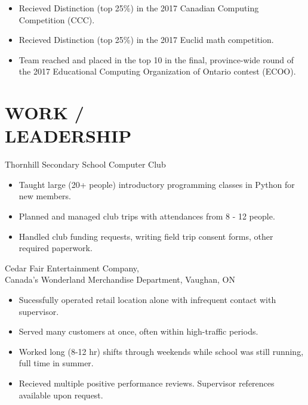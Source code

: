 \documentclass[11pt, margin, line]{res}
\begin{document}
\begin{resume}
        \vspace{-\topsep}
        \begin{itemize}
            \item Recieved Distinction (top 25\%) in the 2017 Canadian Computing Competition (CCC).
            \item Recieved Distinction (top 25\%) in the 2017 Euclid math competition.
            \item Team reached and placed in the top 10 in the final, province-wide round of the 2017 Educational Computing Organization of Ontario contest (ECOO).
        \end{itemize}



\section{WORK /\\ LEADERSHIP} 
        Thornhill Secondary School Computer Club
        \begin{itemize}
            \item Taught large (20+ people) introductory programming classes in Python for new members.
            \item Planned and managed club trips with attendances from 8 - 12 people.
            \item Handled club funding requests, writing field trip consent forms, other required paperwork.
        \end{itemize}

        Cedar Fair Entertainment Company, \\
        Canada's Wonderland Merchandise Department, Vaughan, ON 
        \begin{itemize}
            \item Sucessfully operated retail location alone with infrequent contact with supervisor.
            \item Served many customers at once, often within high-traffic periods.
            \item Worked long (8-12 hr) shifts through weekends while school was still running, full time in summer.
            \item Recieved multiple positive performance reviews. Supervisor references available upon request.
        \end{itemize}
  

\end{resume}
\end{document}
